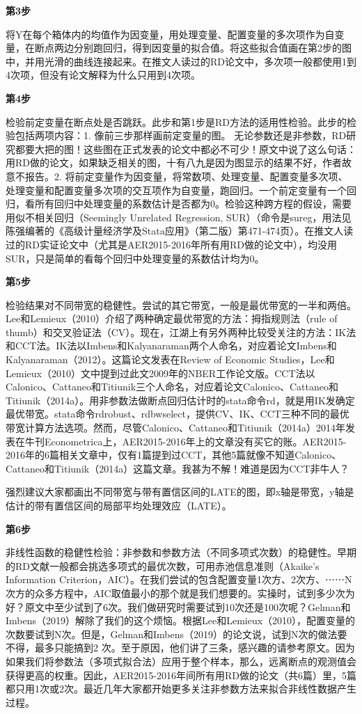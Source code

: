 \documentclass[cn,12pt,math=newtx,citestyle=gb7714-2015,bibstyle=gb7714-2015]{elegantbook}
\begin{document}
	\textbf{第3步}
	
	将Y在每个箱体内的均值作为因变量，用处理变量、配置变量的多次项作为自变量，在断点两边分别跑回归，得到因变量的拟合值。将这些拟合值画在第2步的图中，并用光滑的曲线连接起来。在推文人读过的RD论文中，多次项一般都使用1到4次项，但没有论文解释为什么只用到4次项。
	
	\textbf{第4步}
	
	检验前定变量在断点处是否跳跃。此步和第1步是RD方法的适用性检验。此步的检验包括两项内容：1. 像前三步那样画前定变量的图。 无论参数还是非参数，RD研究都要大把的图！这些图在正式发表的论文中都必不可少！原文中说了这么句话：用RD做的论文，如果缺乏相关的图，十有八九是因为图显示的结果不好，作者故意不报告。2. 将前定变量作为因变量，将常数项、处理变量、配置变量多次项、处理变量和配置变量多次项的交互项作为自变量，跑回归。一个前定变量有一个回归，看所有回归中处理变量的系数估计是否都为0。检验这种跨方程的假设，需要用似不相关回归（Seemingly Unrelated Regression, SUR）（命令是sureg，用法见陈强编著的《高级计量经济学及Stata应用》（第二版）第471-474页）。在推文人读过的RD实证论文中（尤其是AER2015-2016年所有用RD做的论文中），均没用SUR，只是简单的看每个回归中处理变量的系数估计均为0。
	
	\textbf{第5步}
	
	检验结果对不同带宽的稳健性。尝试的其它带宽，一般是最优带宽的一半和两倍。Lee和Lemieux（2010）介绍了两种确定最优带宽的方法：拇指规则法（rule of thumb）和交叉验证法（CV）。现在，江湖上有另外两种比较受关注的方法：IK法和CCT法。IK法以Imbens和Kalyanaraman两个人命名，对应着论文Imbens和Kalyanaraman（2012）。这篇论文发表在Review of Economic Studies，Lee和Lemieux（2010）文中提到过此文2009年的NBER工作论文版。CCT法以Calonico、Cattaneo和Titiunik三个人命名，对应着论文Calonico、Cattaneo和Titiunik（2014a）。用非参数法做断点回归估计时的stata命令rd，就是用IK发确定最优带宽。stata命令rdrobust、rdbwselect，提供CV、IK、CCT三种不同的最优带宽计算方法选项。然而，尽管Calonico、Cattaneo和Titiunik（2014a）2014年发表在牛刊Econometrica上，AER2015-2016年上的文章没有买它的账。AER2015-2016年的6篇相关文章中，仅有1篇提到过CCT，其他5篇就像不知道Calonico、Cattaneo和Titiunik（2014a）这篇文章。我甚为不解！难道是因为CCT非牛人？
	
	强烈建议大家都画出不同带宽与带有置信区间的LATE的图，即x轴是带宽，y轴是估计的带有置信区间的局部平均处理效应（LATE）。
	
	
		\textbf{第6步}
	
	非线性函数的稳健性检验：非参数和参数方法（不同多项式次数）的稳健性。早期的RD文献一般都会挑选多项式的最优次数，可用赤池信息准则（Akaike's Information Criterion，AIC）。在我们尝试的包含配置变量1次方、2次方、⋯⋯N次方的众多方程中，AIC取值最小的那个就是我们想要的。实操时，试到多少次为好？原文中至少试到了6次。我们做研究时需要试到10次还是100次呢？Gelman和Imbens（2019）解除了我们的这个烦恼。根据Lee和Lemieux（2010），配置变量的次数要试到N次。但是，Gelman和Imbens（2019）的论文说，试到N次的做法要不得，最多只能搞到2 次。至于原因，他们讲了三条，感兴趣的请参考原文。因为如果我们将参数法（多项式拟合法）应用于整个样本，那么，远离断点的观测值会获得更高的权重。因此，AER2015-2016年间所有用RD做的论文（共6篇）里，5篇都只用1次或2次。最近几年大家都开始更多关注非参数方法来拟合非线性数据产生过程。
	
\end{document}
